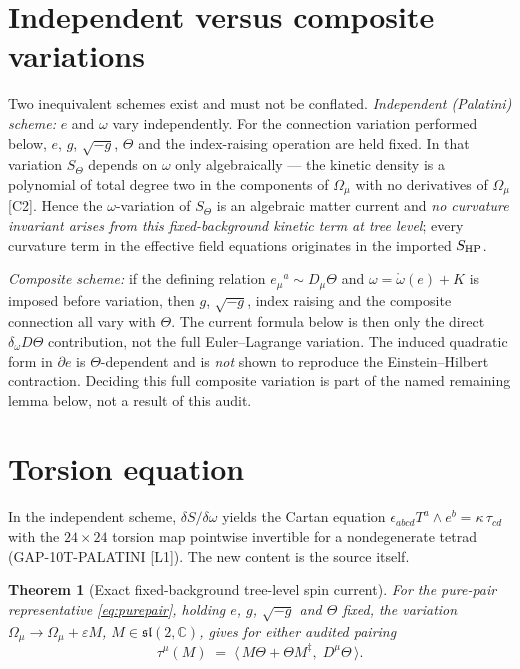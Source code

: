 \documentclass[11pt,a4paper]{article}
\newtheorem{theorem}{Theorem}
\newcommand{\dd}{\ddagger}
\begin{document}
\section{Independent versus composite variations}
Two inequivalent schemes exist and must not be conflated.
\emph{Independent (Palatini) scheme:} $e$ and $\omega$ vary independently.
For the connection variation performed below, $e$, $g$, $\sqrt{-g}$,
$\Theta$ and the index-raising operation are held fixed.  In that variation
$S_\Theta$ depends on $\omega$ only algebraically --- the kinetic density is a
polynomial of total degree two in the components of $\Omega_\mu$ with no
derivatives of $\Omega_\mu$ [C2].  Hence the $\omega$-variation of
$S_\Theta$ is an algebraic matter current and \emph{no curvature invariant
arises from this fixed-background kinetic term at tree level}; every
curvature term in the effective field equations originates in the imported
$S_{\rm HP}$.

\emph{Composite scheme:} if the defining relation
$e_\mu{}^a\sim D_\mu\Theta$ and $\omega=\mathring\omega(e)+K$ is imposed before
variation, then $g$, $\sqrt{-g}$, index raising and the composite connection
all vary with $\Theta$.  The current formula below is then only the direct
$\delta_\omega D\Theta$ contribution, not the full Euler--Lagrange variation.
The induced quadratic form in $\partial e$ is $\Theta$-dependent and is
\emph{not} shown to reproduce the Einstein--Hilbert contraction.  Deciding
this full composite variation is part of the named remaining lemma below,
not a result of this audit.

\section{Torsion equation}
In the independent scheme, $\delta S/\delta\omega$ yields the Cartan equation
$\epsilon_{abcd}T^a\wedge e^b=\kappa\,\tau_{cd}$ with the $24\times24$ torsion
map pointwise invertible for a nondegenerate tetrad (GAP-10T-PALATINI [L1]).
The new content is the source itself.

\begin{theorem}[Exact fixed-background tree-level spin current]\label{thm:spincurrent}
For the pure-pair representative \eqref{eq:purepair}, holding $e$, $g$,
$\sqrt{-g}$ and $\Theta$ fixed, the variation
$\Omega_\mu\to\Omega_\mu+\varepsilon M$,
$M\in\mathfrak{sl}(2,\mathbb C)$, gives for either audited pairing
\begin{equation}
  \tau^{\mu}(M)\;=\;\big\langle\,M\Theta+\Theta M^{\dd},\;D^\mu\Theta\,\big\rangle .
  \label{eq:tau}
\end{equation}
\end{theorem}
\end{document}
